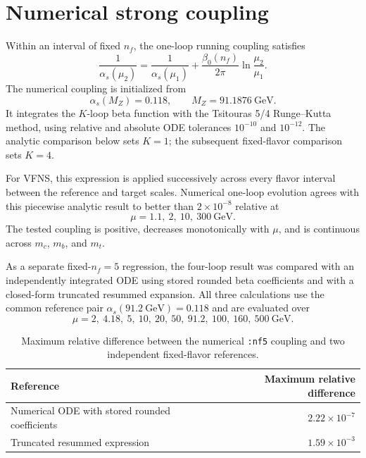 \documentclass[11pt]{article}
\begin{document}
\section{Numerical strong coupling}

Within an interval of fixed \(n_f\), the one-loop running coupling satisfies
\begin{equation}
  \frac{1}{\alpha_s(\mu_2)}
  =
  \frac{1}{\alpha_s(\mu_1)}
  +\frac{\beta_0(n_f)}{2\pi}
   \ln\frac{\mu_2}{\mu_1}.
  \label{eq:one-loop-alpha}
\end{equation}
The numerical coupling is initialized from
\[
  \alpha_s(M_Z)=0.118,\qquad M_Z=91.1876~\mathrm{GeV}.
\]
It integrates the \(K\)-loop beta function with the Tsitouras 5/4 Runge--Kutta
method, using relative and absolute ODE tolerances \(10^{-10}\) and
\(10^{-12}\). The analytic comparison below sets \(K=1\); the subsequent
fixed-flavor comparison sets \(K=4\).

For VFNS, this expression is applied successively across every flavor
interval between the reference and target scales. Numerical one-loop
evolution agrees with this piecewise analytic result to better than
\(2\times10^{-8}\) relative at
\[
  \mu=1.1,\ 2,\ 10,\ 300~\mathrm{GeV}.
\]
The tested coupling is positive, decreases monotonically with \(\mu\), and
is continuous across \(m_c\), \(m_b\), and \(m_t\).

As a separate fixed-\(n_f=5\) regression, the four-loop result was compared
with an independently integrated ODE using stored rounded beta coefficients
and with a closed-form truncated resummed expansion. All three calculations
use the common reference pair
\(\alpha_s(91.2~\mathrm{GeV})=0.118\) and are evaluated over
\[
  \mu=2,\ 4.18,\ 5,\ 10,\ 20,\ 50,\ 91.2,\ 100,\ 160,\ 500~\mathrm{GeV}.
\]

\begin{table}[H]
\centering
\caption{Maximum relative difference between the numerical
\texttt{:nf5} coupling and two independent fixed-flavor references.}
\label{tab:fixed-alpha}
\begin{tabular}{lr}
\toprule
Reference & Maximum relative difference\\
\midrule
Numerical ODE with stored rounded coefficients & \(2.22\times10^{-7}\)\\
Truncated resummed expression & \(1.59\times10^{-3}\)\\
\bottomrule
\end{tabular}
\end{table}
\end{document}
